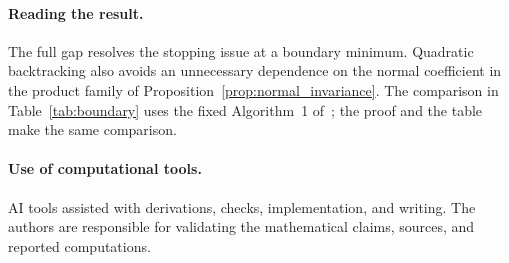\paragraph{Reading the result.}
The full gap resolves the stopping issue at a boundary minimum.
Quadratic backtracking also avoids an unnecessary dependence on the
normal coefficient in the product family of
Proposition~\ref{prop:normal_invariance}. The comparison in
Table~\ref{tab:boundary} uses the fixed Algorithm~1 of~\cite{vyguzov};
the proof and the table make the same comparison.

\paragraph{Use of computational tools.}
AI tools assisted with derivations, checks, implementation, and writing.
The authors are responsible for validating the mathematical claims,
sources, and reported computations.
